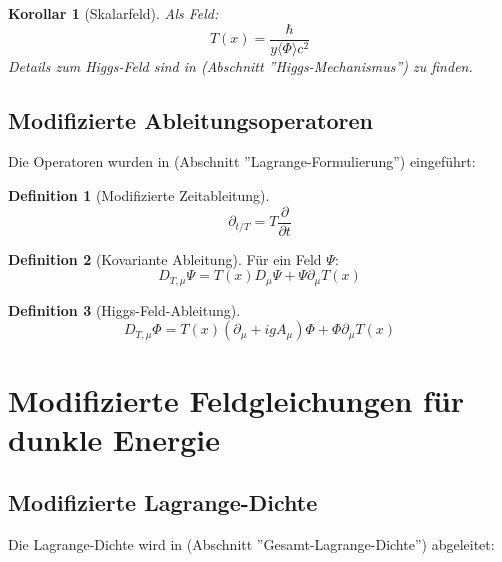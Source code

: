 \documentclass[a4paper,12pt]{article}
\newtheorem{corollary}[theorem]{Korollar}
\theoremstyle{definition}
\newtheorem{definition}{Definition}[theorem]
\theoremstyle{remark}
\newcommand{\Tfield}{T(x)}
\newcommand{\DhiggsT}{\Tfield (\partial_\mu + ig A_\mu) \Phi + \Phi \partial_\mu \Tfield}
\begin{document}
	\begin{corollary}[Skalarfeld]
		Als Feld:
		\begin{equation}
			\Tfield = \frac{\hbar}{y \langle\Phi\rangle c^2}
		\end{equation}
		Details zum Higgs-Feld sind in \cite{pascher_higgs_2025} (Abschnitt ''Higgs-Mechanismus'') zu finden.
	\end{corollary}
	
	\subsection{Modifizierte Ableitungsoperatoren}
	
	Die Operatoren wurden in \cite{pascher_lagrange_2025} (Abschnitt ''Lagrange-Formulierung'') eingeführt:
	
	\begin{definition}[Modifizierte Zeitableitung]
		\begin{equation}
			\partial_{t/T} = T \frac{\partial}{\partial t}
		\end{equation}
	\end{definition}
	
	\begin{definition}[Kovariante Ableitung]
		Für ein Feld \(\Psi\):
		\begin{equation}
			D_{T,\mu} \Psi = \Tfield D_\mu \Psi + \Psi \partial_\mu \Tfield
		\end{equation}
	\end{definition}
	
	\begin{definition}[Higgs-Feld-Ableitung]
		\begin{equation}
			D_{T,\mu} \Phi = \DhiggsT
		\end{equation}
	\end{definition}
	
	\section{Modifizierte Feldgleichungen für dunkle Energie}
	
	\subsection{Modifizierte Lagrange-Dichte}
	
	Die Lagrange-Dichte wird in \cite{pascher_lagrange_2025} (Abschnitt ''Gesamt-Lagrange-Dichte'') abgeleitet:
	
\end{document}
